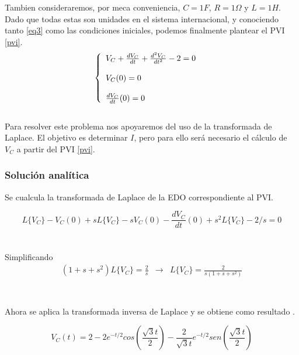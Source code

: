 \documentclass[letterpaper,12pt]{article} %
\begin{document}
Tambien consideraremos, por meca conveniencia, $C=1F$, $R=1\Omega$ y $L=1H$. Dado que todas estas son unidades en el sistema internacional, y conociendo tanto \eqref{eq3} como las condiciones iniciales, podemos finalmente plantear el PVI \eqref{pvi}.\\


\begin{equation}
\left\{ \begin{array}{lcc}
            V_C + \frac{dV_C}{dt} + \frac{d^2V_C}{dt^2}-2=0 &  \\
             \\V_C(0)=0\\
             \\ \frac{dV_C}{dt}(0)=0
             \end{array}\\
   \right.
\label{pvi}
\end{equation}\\

Para resolver este problema nos apoyaremos del uso de la transformada de Laplace. El objetivo es determinar $I$, pero para ello será necesario el cálculo de $V_C$ a partir del PVI \eqref{pvi}.
\subsubsection*{Solución analítica}

Se cualcula la transformada de Laplace de la EDO correspondiente al PVI.

\begin{equation*}
L\{V_C\}-V_C(0)+sL\{V_C\}-sV_C(0)-\frac{dV_C}{dt}(0)+s^2L\{V_C\}-2/s=0
\end{equation*}
\\ \\ Simplificando
\begin{equation*}
\begin{array}{lcc}
(1+s+s^2)L\{ V_C \}=\frac{2}{s} & \longrightarrow & L\{V_C\}=\frac{2}{s(1+s+s^2)}\\
\end{array}
\end{equation*}
\\ \\ Ahora se aplica la transformada inversa de Laplace y se obtiene como resultado .

\begin{equation}
V_C(t)=2-2e^{-t/2}cos\left( \frac{\sqrt{3}t}{2}\right) -\frac{2}{\sqrt{3}t}e^{-t/2}sen\left( \frac{\sqrt{3}t}{2}\right) 
\label{vc1}
\end{equation}\\
\end{document}
